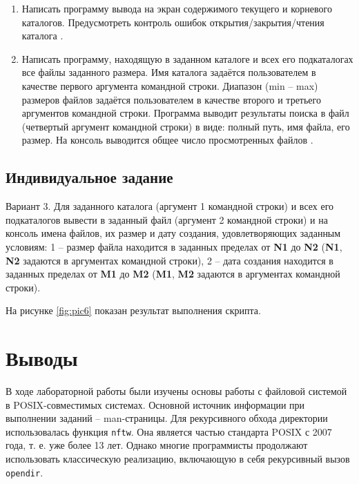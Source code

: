 \begin{enumerate}[listparindent=\fivecharsapprox]
	\item Написать программу вывода на экран содержимого текущего и корневого каталогов.
		Предусмотреть контроль ошибок открытия/закрытия/чтения каталога .



	\item Написать программу, находящую в заданном каталоге и всех его подкаталогах все файлы заданного размера.
Имя каталога задаётся пользователем в качестве первого аргумента командной строки.
Диапазон (min -- max) размеров файлов задаётся пользователем в качестве второго и третьего аргументов командной строки.
Программа выводит результаты поиска в файл (четвертый аргумент командной строки) в виде: полный путь, имя файла, его размер.
На консоль выводится общее число просмотренных файлов .



\end{enumerate}

\subsection{Индивидуальное задание}
\label{sec:job:personal_task}

Вариант 3. Для заданного каталога (аргумент 1 командной строки) и всех его подкаталогов вывести в заданный файл (аргумент 2 командной строки) и на консоль имена файлов, их размер и дату создания, удовлетворяющих заданным условиям: 1 – размер файла находится в заданных пределах от \textbf{N1} до \textbf{N2} (\textbf{N1}, \textbf{N2} задаются в аргументах командной строки), 2 – дата создания находится в заданных пределах от \textbf{M1} до \textbf{M2} (\textbf{M1}, \textbf{M2} задаются в аргументах командной строки).



На рисунке \ref{fig:pic6} показан результат выполнения скрипта.


\section{Выводы}
\label{sec:conclusion}

В ходе лабораторной работы были изучены основы работы с файловой системой в POSIX-совместимых системах. Основной источник информации при выполнении заданий -- man-страницы.
Для рекурсивного обхода директории использовалась функция \lstinline{nftw}. Она является частью стандарта POSIX с 2007 года, т. е. уже более 13 лет.
Однако многие программисты продолжают использовать классическую реализацию, включающую в себя рекурсивный вызов \lstinline{opendir}.

